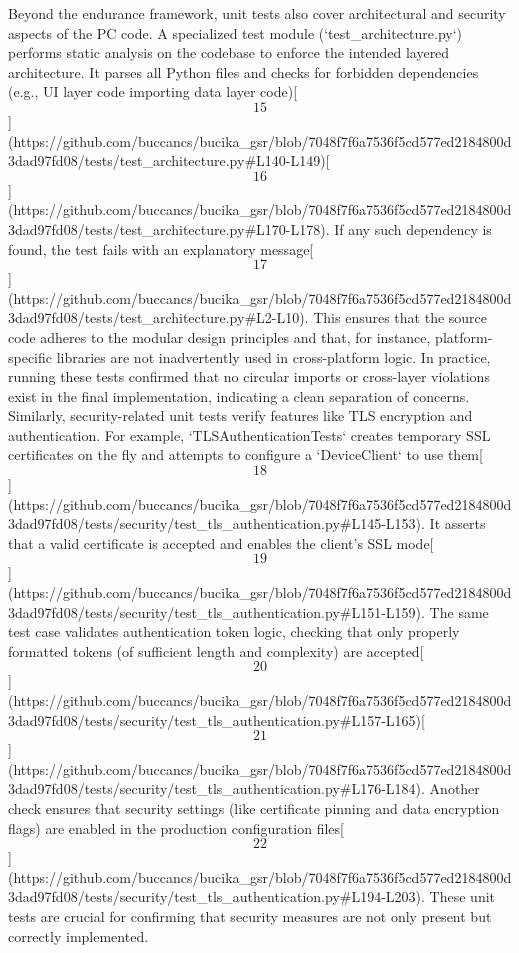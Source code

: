 \documentclass[12pt,a4paper]{article}
\begin{document}
{Beyond the endurance framework, unit tests also cover architectural and
security aspects of the PC code. A specialized test module
(`test_architecture.py`) performs static analysis on the codebase to
enforce the intended layered architecture. It parses all Python files
and checks for forbidden dependencies (e.g., UI layer code importing
data layer
code)[\[15\]](https://github.com/buccancs/bucika_gsr/blob/7048f7f6a7536f5cd577ed2184800d3dad97fd08/tests/test_architecture.py#L140-L149)[\[16\]](https://github.com/buccancs/bucika_gsr/blob/7048f7f6a7536f5cd577ed2184800d3dad97fd08/tests/test_architecture.py#L170-L178).
If any such dependency is found, the test fails with an explanatory
message[\[17\]](https://github.com/buccancs/bucika_gsr/blob/7048f7f6a7536f5cd577ed2184800d3dad97fd08/tests/test_architecture.py#L2-L10).
This ensures that the source code adheres to the modular design
principles and that, for instance, platform-specific libraries are not
inadvertently used in cross-platform logic. In practice, running these
tests confirmed that no circular imports or cross-layer violations exist
in the final implementation, indicating a clean separation of concerns.
Similarly, security-related unit tests verify features like TLS
encryption and authentication. For example, `TLSAuthenticationTests`
creates temporary SSL certificates on the fly and attempts to configure
a `DeviceClient` to use
them[\[18\]](https://github.com/buccancs/bucika_gsr/blob/7048f7f6a7536f5cd577ed2184800d3dad97fd08/tests/security/test_tls_authentication.py#L145-L153).
It asserts that a valid certificate is accepted and enables the client's
SSL
mode[\[19\]](https://github.com/buccancs/bucika_gsr/blob/7048f7f6a7536f5cd577ed2184800d3dad97fd08/tests/security/test_tls_authentication.py#L151-L159).
The same test case validates authentication token logic, checking that
only properly formatted tokens (of sufficient length and complexity) are
accepted[\[20\]](https://github.com/buccancs/bucika_gsr/blob/7048f7f6a7536f5cd577ed2184800d3dad97fd08/tests/security/test_tls_authentication.py#L157-L165)[\[21\]](https://github.com/buccancs/bucika_gsr/blob/7048f7f6a7536f5cd577ed2184800d3dad97fd08/tests/security/test_tls_authentication.py#L176-L184).
Another check ensures that security settings (like certificate pinning
and data encryption flags) are enabled in the production configuration
files[\[22\]](https://github.com/buccancs/bucika_gsr/blob/7048f7f6a7536f5cd577ed2184800d3dad97fd08/tests/security/test_tls_authentication.py#L194-L203).
These unit tests are crucial for confirming that security measures are
not only present but correctly implemented.

}
\end{document}
